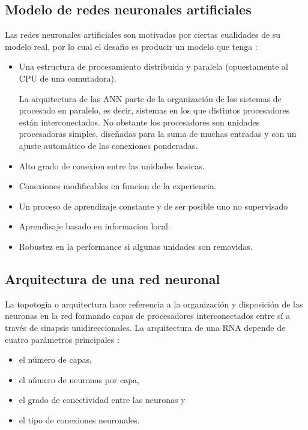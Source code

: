\subsection{Modelo de redes neuronales artificiales}

Las redes neuronales artificiales son motivadas por ciertas cualidades de su modelo real, por lo cual el
desafio es producir un modelo que tenga \cite{nacelle2009redes}:
\begin{itemize}
\item  Una estructura de procesamiento distribuida y paralela (opuestamente al CPU de una comutadora).

La arquitectura de las ANN parte de la organización de los sistemas de procesado en paralelo, es decir, sistemas en los que distintos procesadores están interconectados. No
obstante los procesadores son unidades procesadoras simples, diseñadas para la suma de muchas entradas y con un ajuste automático de las conexiones ponderadas. 
\item Alto grado de conexion entre las unidades basicas.
\item Conexiones modificables en funcion de la experiencia.
\item Un proceso de aprendizaje constante y de ser posible uno no supervisado
\item Aprendisaje basado en informacion local.
\item Robustez en la performance si algunas unidades son removidas.

\end{itemize}

\subsection{Arquitectura de una red neuronal}
La topotogia o arquitectura hace referencia a la organización y disposición de las neuronas en la red formando capas de procesadores interconectados entre sí a través de sinapsis unidireccionales. La arquitectura de una RNA depende de cuatro parámetros principales \cite{lopez2008redes}: 

\begin{itemize}
\item el número de capas,
\item el número de neuronas por capa,
\item el grado de conectividad entre las neuronas y 
\item el tipo de conexiones neuronales. 
\end{itemize}


